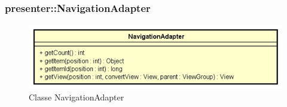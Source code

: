 \documentclass[../DefinizioneDiProdotto.tex]{subfiles}
\begin{document}
\subsubsection{presenter::NavigationAdapter}

    \begin{figure}[H]
        \centering
        \includegraphics{img/NavigationAdapter.png}
        \caption{Classe NavigationAdapter}\label{fig:presenter::NavigationAdapter} 
    \end{figure}
\end{document}
